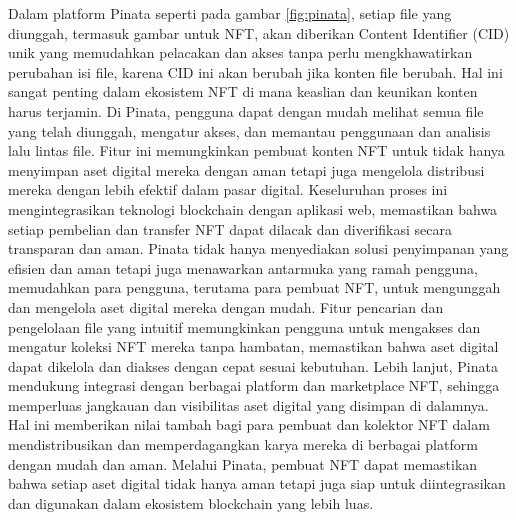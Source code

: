    Dalam platform Pinata seperti pada gambar \ref{fig:pinata}, setiap file yang diunggah, termasuk gambar untuk NFT, akan diberikan Content Identifier (CID) unik yang memudahkan pelacakan dan akses tanpa perlu mengkhawatirkan perubahan isi file, karena CID ini akan berubah jika konten file berubah. Hal ini sangat penting dalam ekosistem NFT di mana keaslian dan keunikan konten harus terjamin. Di Pinata, pengguna dapat dengan mudah melihat semua file yang telah diunggah, mengatur akses, dan memantau penggunaan dan analisis lalu lintas file. Fitur ini memungkinkan pembuat konten NFT untuk tidak hanya menyimpan aset digital mereka dengan aman tetapi juga mengelola distribusi mereka dengan lebih efektif dalam pasar digital. Keseluruhan proses ini mengintegrasikan teknologi blockchain dengan aplikasi web, memastikan bahwa setiap pembelian dan transfer NFT dapat dilacak dan diverifikasi secara transparan dan aman. Pinata tidak hanya menyediakan solusi penyimpanan yang efisien dan aman tetapi juga menawarkan antarmuka yang ramah pengguna, memudahkan para pengguna, terutama para pembuat NFT, untuk mengunggah dan mengelola aset digital mereka dengan mudah. Fitur pencarian dan pengelolaan file yang intuitif memungkinkan pengguna untuk mengakses dan mengatur koleksi NFT mereka tanpa hambatan, memastikan bahwa aset digital dapat dikelola dan diakses dengan cepat sesuai kebutuhan. Lebih lanjut, Pinata mendukung integrasi dengan berbagai platform dan marketplace NFT, sehingga memperluas jangkauan dan visibilitas aset digital yang disimpan di dalamnya. Hal ini memberikan nilai tambah bagi para pembuat dan kolektor NFT dalam mendistribusikan dan memperdagangkan karya mereka di berbagai platform dengan mudah dan aman. Melalui Pinata, pembuat NFT dapat memastikan bahwa setiap aset digital tidak hanya aman tetapi juga siap untuk diintegrasikan dan digunakan dalam ekosistem blockchain yang lebih luas.
  
